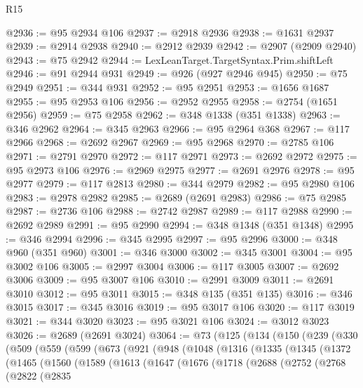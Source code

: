 \begin{lexlean}{R15}
\begin{coremodule}
{{{{{{{{{{{{{{{{{{{{{{{{{{{{{{{{{{{{{{{{{{{{{{{{{{{{{{{{{{{{{{{{{{{{{{@2936 := @95 @2934 @106
@2937 := @2918 @2936
@2938 := @1631 @2937
@2939 := @2914 @2938
@2940 := @2912 @2939
@2942 := @2907 (@2909 @2940)
@2943 := @75 @2942
@2944 := LexLeanTarget.TargetSyntax.Prim.shiftLeft
@2946 := @91 @2944 @931
@2949 := @926 (@927 @2946 @945)
@2950 := @75 @2949
@2951 := @344 @931
@2952 := @95 @2951
@2953 := @1656 @1687
@2955 := @95 @2953 @106
@2956 := @2952 @2955
@2958 := @2754 (@1651 @2956)
@2959 := @75 @2958
@2962 := @348 @1338 (@351 @1338)
@2963 := @346 @2962
@2964 := @345 @2963
@2966 := @95 @2964 @368
@2967 := @117 @2966
@2968 := @2692 @2967
@2969 := @95 @2968
@2970 := @2785 @106
@2971 := @2791 @2970
@2972 := @117 @2971
@2973 := @2692 @2972
@2975 := @95 @2973 @106
@2976 := @2969 @2975
@2977 := @2691 @2976
@2978 := @95 @2977
@2979 := @117 @2813
@2980 := @344 @2979
@2982 := @95 @2980 @106
@2983 := @2978 @2982
@2985 := @2689 (@2691 @2983)
@2986 := @75 @2985
@2987 := @2736 @106
@2988 := @2742 @2987
@2989 := @117 @2988
@2990 := @2692 @2989
@2991 := @95 @2990
@2994 := @348 @1348 (@351 @1348)
@2995 := @346 @2994
@2996 := @345 @2995
@2997 := @95 @2996
@3000 := @348 @960 (@351 @960)
@3001 := @346 @3000
@3002 := @345 @3001
@3004 := @95 @3002 @106
@3005 := @2997 @3004
@3006 := @117 @3005
@3007 := @2692 @3006
@3009 := @95 @3007 @106
@3010 := @2991 @3009
@3011 := @2691 @3010
@3012 := @95 @3011
@3015 := @348 @135 (@351 @135)
@3016 := @346 @3015
@3017 := @345 @3016
@3019 := @95 @3017 @106
@3020 := @117 @3019
@3021 := @344 @3020
@3023 := @95 @3021 @106
@3024 := @3012 @3023
@3026 := @2689 (@2691 @3024)
@3064 := @73
    (@125
      (@134
        (@150
          (@239
            (@330
              (@509
                (@559
                  (@599
                    (@673
                      (@921
                        (@948
                          (@1048
                            (@1316
                              (@1335
                                (@1345
                                  (@1372
                                    (@1465
                                      (@1560
                                        (@1589
                                          (@1613
                                            (@1647
                                              (@1676
                                                (@1718
                                                  (@2688
                                                    (@2752
                                                      (@2768
                                                        (@2822
                                                          (@2835
}}}}}}}}}}}}}}}}}}}}}}}}}}}}}}}}}}}}}}}}}}}}}}}}}}}}}}}}}}}}}}}}}}}}}}
\end{coremodule}
\end{lexlean}
